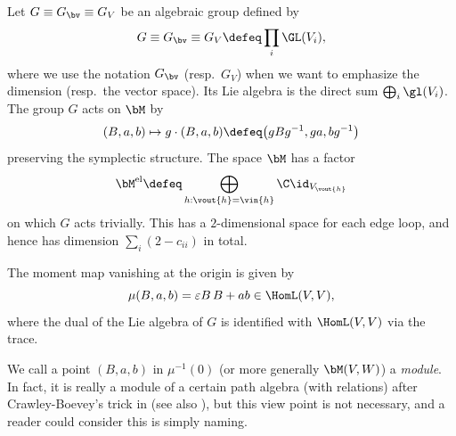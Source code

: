 Let $G \equiv G_\bv \equiv G_V$ be an algebraic group def\/ined by
\begin{equation*}
   G \equiv G_\bv \equiv G_V \defeq \prod_i \GL(V_i),
\end{equation*}
where we use the notation $G_\bv$ (resp.\ $G_V$) when we want to
emphasize the dimension (resp.\ the vector space). Its Lie algebra is
the direct sum $\bigoplus_i \gl(V_i)$.
%
The group $G$ acts on $\bM$ by
\begin{equation*}\label{eq:Kaction}
  (B,a,b) \mapsto g\cdot (B,a,b)
  \defeq \big(g B g^{-1}, ga, bg^{-1}\big)
\end{equation*}
preserving the symplectic structure. The space $\bM$ has a factor
\begin{equation}\label{eq:trivial}
   \bM^{\text{el}}\defeq
   \bigoplus_{h : \vout{h} = \vin{h}} \C \id_{V_{\vout{h}}}
\end{equation}
on which $G$ acts trivially. This has a $2$-dimensional space for each
edge loop, and hence has dimension $\sum_i (2 - c_{ii})$ in total.

The moment map vanishing at the origin is given by
\begin{equation}
  \mu(B, a, b) = \varepsilon B\, B + ab \in \HomL(V, V),
\end{equation}
where the dual of the Lie algebra of $G$ is identif\/ied with
$\HomL(V, V)$ via the trace.

We call a point $(B,a,b)$ in $\mu^{-1}(0)$ (or more generally
$\bM(V,W)$) a {\it module}. In fact, it is really a module of a
certain path algebra (with relations) after Crawley-Boevey's trick in
\cite[{the end of Introduction}]{CB} (see also ),
but this view point is not necessary, and a reader could consider this
is simply naming.

